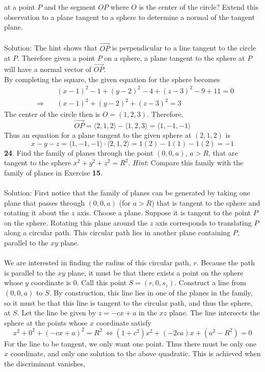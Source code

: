 \documentclass[12pt]{amsbook}
\newcommand{\la}{\langle}
\newcommand{\ra}{\rangle}
\begin{document}
at a point $P$ and the segment $OP$ where $O$ is the center
of the circle? Extend this observation to a plane tangent 
to a sphere to determine a normal of the tangent plane.\\
\\
{\sc Solution}: The hint shows that $\overrightarrow{OP}$ is perpendicular to a line tangent to the circle at $P$. Therefore given a point $P$ on a sphere, a plane tangent to the sphere at $P$ will have a normal vector of $\overrightarrow{OP}$. 
\\
By completing the square, the given equation for the sphere becomes
\begin{eqnarray*}
&&\quad (x-1)^2-1+(y-2)^2-4+(z-3)^2-9+11=0\\
&\Rightarrow&\quad
(x-1)^2+(y-2)^2+(z-3)^2=3
\end{eqnarray*}
The center of the circle then is $O=(1,2,3)$. Therefore,
$$\overrightarrow{OP}=\la 2,1,2\ra-\la 1,2,3\ra=\la 1,-1,-1\ra$$
Thus an equation for a plane tangent to the given sphere at $(2,1,2)$ is
$$x-y-z=\la 1,-1,-1\ra\cdot\la 2,1,2\ra=1(2)-1(1)-1(2)=-1$$
{\small\bf 24}. Find the family of planes through the 
point $(0,0, a)$, $a>R$, that are tangent to the sphere
$x^2+y^2+z^2=R^2$. {\it Hint}: Compare this family with 
the family of planes in Exercise {\small\bf 15}. \\
\\
{\sc Solution}: First notice that the family of planes can be generated by taking one plane that passes through $(0,0,a)$ (for $a>R$) that is tangent to the sphere and rotating it about the $z$ axis. Choose a plane. Suppose it is tangent to the point $P$ on the sphere. Rotating this plane around the $z$ axis corresponds to translating $P$ along a circular path. This circular path lies in another plane containing $P$, parallel to the $xy$ plane. 
\\
\\
We are interested in finding the radius of this circular path, $r$. Because the path is parallel to the $xy$ plane, it must be that there exists a point on the sphere whose $y$ coordinate is $0$. Call this point $S=(r,0,s_z)$. Construct a line from $(0,0,a)$ to $S$. By construction, this line lies in one of the planes in the family, so it must be that this line is tangent to the circular path, and thus the sphere, at $S$. Let the line be given by $z=-cx+a$ in the $xz$ plane. The line intersects the sphere at the points whose $x$ coordinate satisfy
$$x^2+0^2+(-cx+a)^2=R^2 \ \Leftrightarrow (1+c^2)x^2+(-2ca)x+(a^2-R^2)=0$$
For the line to be tangent, we only want one point. Thus there must be only one $x$ coordinate, and only one solution to the above quadratic. This is achieved when the discriminant vanishes,
\end{document}
